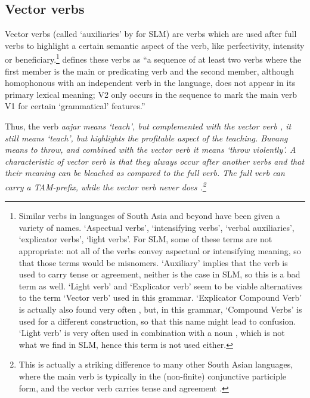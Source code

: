 \subsection{Vector verbs}\label{sec:wc:Vectorverbs}
Vector verbs  \citep{Pray1970,Hook1974,Masica1991,Kachru1993} (called `auxiliaries' by \citet{SmithEtAl2006cll} for SLM) are verbs which are used after full verbs to highlight a certain semantic aspect of the verb, like perfectivity, intensity or beneficiary.\footnote{Similar verbs in languages of South Asia and beyond have been
 given a variety of names. `Aspectual verbs', `intensifying verbs', `verbal auxiliaries', `explicator verbs', `light verbs'. For SLM, some of these terms are not appropriate: not all of the verbs convey aspectual or intensifying meaning, so that those terms would be  misnomers. `Auxiliary' implies that the verb is used to carry tense or agreement, neither is the case in SLM, so this is a bad term as well. `Light verb' and `Explicator verb'  seem to be viable alternatives to the term `Vector verb' used in this grammar. `Explicator Compound Verb' is actually also found very often \citep{AbbiEtAl1991evc,Abbi1994}, but, in this grammar, `Compound Verbs' is used for a different construction, so that this name might lead to confusion. `Light verb' is very often used in combination with a noun \citep{Butt2003jungle}, which is not what we find in SLM, hence this term is not used either.}
\citet{AbbiEtAl1991evc} defines these verbs as ``a sequence of at least two verbs where the first member is the main or predicating verb and the second member, although homophonous with an independent verb in the language, does not appear in its primary  lexical meaning; V2 only occurs  in the sequence to mark the main verb V1 for certain `grammatical' features.''

Thus, the verb \em aajar \em means `teach', but complemented with the vector verb , it still means `teach', but highlights the profitable aspect of the teaching. \em Buvang \em means to throw, and combined with the vector verb  it means `throw violently'. A characteristic of vector verb is that they always occur after another verbs and that their meaning can be bleached as compared to the full verb. The full verb can carry a TAM-prefix, while the vector verb never does \citep[171]{SmithEtAl2006cll}.\footnote{This is actually a striking difference to many other South Asian languages, where the main verb is typically in the (non-finite) conjunctive participle form, and the vector verb carries tense and agreement \citep[141]{Masica1976}.}

